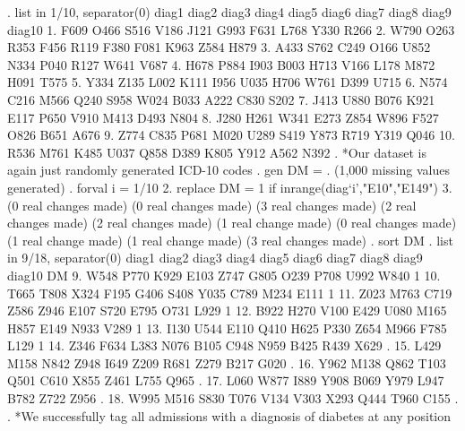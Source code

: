 . list in 1/10, separator(0)
{\smallskip}
     {\TLC}
     {\VBAR} diag1   diag2   diag3   diag4   diag5   diag6   diag7   diag8   diag9   diag10 {\VBAR}
     {\LFTT}
  1. {\VBAR}  F609    O466    S516    V186    J121    G993    F631    L768    Y330     R266 {\VBAR}
  2. {\VBAR}  W790    O263    R353    F456    R119    F380    F081    K963    Z584     H879 {\VBAR}
  3. {\VBAR}  A433    S762    C249    O166    U852    N334    P040    R127    W641     V687 {\VBAR}
  4. {\VBAR}  H678    P884    I903    B003    H713    V166    L178    M872    H091     T575 {\VBAR}
  5. {\VBAR}  Y334    Z135    L002    K111    I956    U035    H706    W761    D399     U715 {\VBAR}
  6. {\VBAR}  N574    C216    M566    Q240    S958    W024    B033    A222    C830     S202 {\VBAR}
  7. {\VBAR}  J413    U880    B076    K921    E117    P650    V910    M413    D493     N804 {\VBAR}
  8. {\VBAR}  J280    H261    W341    E273    Z854    W896    F527    O826    B651     A676 {\VBAR}
  9. {\VBAR}  Z774    C835    P681    M020    U289    S419    Y873    R719    Y319     Q046 {\VBAR}
 10. {\VBAR}  R536    M761    K485    U037    Q858    D389    K805    Y912    A562     N392 {\VBAR}
     {\BLC}
{\smallskip}
. *Our dataset is again just randomly generated ICD-10 codes
. gen DM = .
(1,000 missing values generated)
{\smallskip}
. forval i = 1/10 {\lbr}
  2. replace DM = 1 if inrange(diag`i',"E10","E149")
  3. {\rbr}
(0 real changes made)
(0 real changes made)
(3 real changes made)
(2 real changes made)
(2 real changes made)
(1 real change made)
(0 real changes made)
(1 real change made)
(1 real change made)
(3 real changes made)
{\smallskip}
. sort DM
{\smallskip}
. list in 9/18, separator(0)
{\smallskip}
     {\TLC}
     {\VBAR} diag1   diag2   diag3   diag4   diag5   diag6   diag7   diag8   diag9   diag10   DM {\VBAR}
     {\LFTT}
  9. {\VBAR}  W548    P770    K929    E103    Z747    G805    O239    P708    U992     W840    1 {\VBAR}
 10. {\VBAR}  T665    T808    X324    F195    G406    S408    Y035    C789    M234     E111    1 {\VBAR}
 11. {\VBAR}  Z023    M763    C719    Z586    Z946    E107    S720    E795    O731     L929    1 {\VBAR}
 12. {\VBAR}  B922    H270    V100    E429    U080    M165    H857    E149    N933     V289    1 {\VBAR}
 13. {\VBAR}  I130    U544    E110    Q410    H625    P330    Z654    M966    F785     L129    1 {\VBAR}
 14. {\VBAR}  Z346    F634    L383    N076    B105    C948    N959    B425    R439     X629    . {\VBAR}
 15. {\VBAR}  L429    M158    N842    Z948    I649    Z209    R681    Z279    B217     G020    . {\VBAR}
 16. {\VBAR}  Y962    M138    Q862    T103    Q501    C610    X855    Z461    L755     Q965    . {\VBAR}
 17. {\VBAR}  L060    W877    I889    Y908    B069    Y979    L947    B782    Z722     Z956    . {\VBAR}
 18. {\VBAR}  W995    M516    S830    T076    V134    V303    X293    Q444    T960     C155    . {\VBAR}
     {\BLC}
{\smallskip}
. *We successfully tag all admissions with a diagnosis of diabetes at any position
